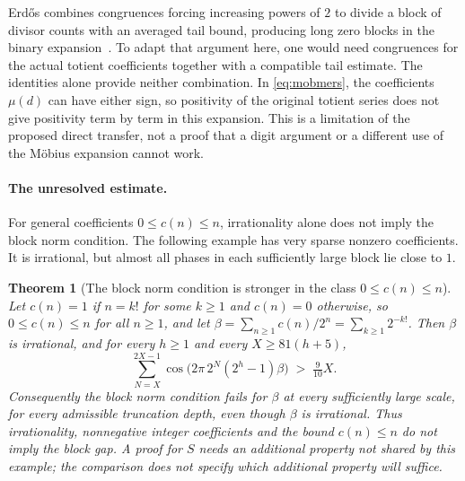 \documentclass[11pt]{article}
\theoremstyle{plain}
\newtheorem{thm}{Theorem}[section]
\theoremstyle{definition}
\theoremstyle{remark}
\begin{document}
Erd\H{o}s combines congruences forcing increasing powers of $2$ to divide
a block of divisor counts with an averaged tail bound, producing long
zero blocks in the binary expansion~\cite[pp.~63--66]{erdos1948lambert}.
To adapt that argument here, one would need congruences for the actual
totient coefficients together with a compatible tail estimate. The
identities alone provide neither combination. In \eqref{eq:mobmers},
the coefficients $\mu(d)$ can have either sign, so positivity of the
original totient series does not give positivity term by term in this
expansion. This is a limitation of the proposed direct transfer, not a
proof that a digit argument or a different use of the M\"obius expansion
cannot work.

\paragraph{The unresolved estimate.}
For general coefficients $0\le c(n)\le n$, irrationality alone does not
imply the block norm condition. The following example has very sparse
nonzero coefficients. It is irrational, but almost all phases in each
sufficiently large block lie close to $1$.

\begin{thm}[The block norm condition is stronger in the class $0\le c(n)\le n$]\label{thm:lacunary}
Let $c(n)=1$ if $n=k!$ for some $k\ge 1$ and $c(n)=0$ otherwise, so
$0\le c(n)\le n$ for all $n\ge 1$, and let $\beta=\sum_{n\ge1}c(n)/2^{n}
=\sum_{k\ge 1}2^{-k!}$. Then $\beta$ is irrational, and for every $h\ge 1$
and every $X\ge 81(h+5)$,
\[
  \sum_{N=X}^{2X-1}\cos\bigl(2\pi\,2^{N}(2^{h}-1)\beta\bigr) \;>\; \tfrac{9}{10}X .
\]
Consequently the block norm condition fails for $\beta$ at every
sufficiently large scale, for every admissible truncation depth, even though
$\beta$ is irrational. Thus irrationality, nonnegative integer coefficients
and the bound $c(n)\le n$ do not imply the block gap. A proof for $S$
needs an additional property not shared by this example; the comparison
does not specify which additional property will suffice.
\end{thm}
\end{document}
